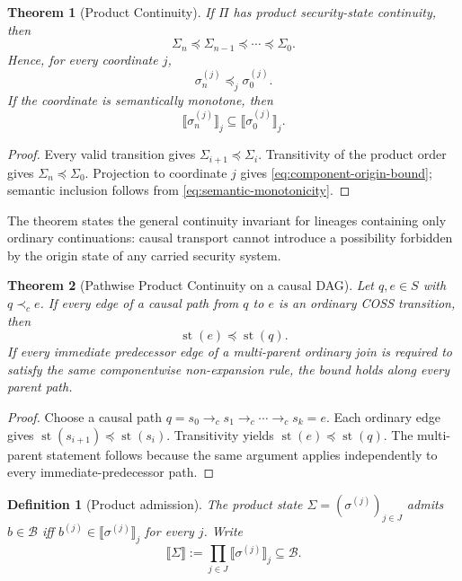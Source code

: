 \documentclass[10pt,twocolumn]{article}
\newcommand{\Model}{\textnormal{\textsc{COSS}}\xspace}
\newcommand{\sem}[1]{\llbracket #1 \rrbracket}
\newcommand{\state}{\Sigma}
\newcommand{\coord}{\sigma}
\newcommand{\st}{\operatorname{st}}
\newcommand{\hb}{\prec_{c}}
\newtheorem{definition}{Definition}
\newtheorem{theorem}{Theorem}
\begin{document}
\begin{theorem}[Product Continuity]
If $\Pi$ has product security-state continuity, then
\begin{equation}
  \state_n\preceq\state_{n-1}\preceq\cdots\preceq\state_0.
\end{equation}
Hence, for every coordinate $j$,
\begin{equation}
  \coord_n^{(j)}\preceq_j\coord_0^{(j)}.
  \label{eq:component-origin-bound}
\end{equation}
If the coordinate is semantically monotone, then
\begin{equation}
  \sem{\coord_n^{(j)}}_j
  \subseteq
  \sem{\coord_0^{(j)}}_j.
\end{equation}
\end{theorem}

\begin{proof}
Every valid transition gives
$\state_{i+1}\preceq\state_i$.  Transitivity of the product order gives
$\state_n\preceq\state_0$.  Projection to coordinate $j$ gives
\eqref{eq:component-origin-bound}; semantic inclusion follows from
\eqref{eq:semantic-monotonicity}.
\end{proof}

The theorem states the general continuity invariant for lineages containing
only ordinary continuations: causal transport cannot introduce a possibility
forbidden by the origin state of any carried security system.


\begin{theorem}[Pathwise Product Continuity on a causal DAG]
\label{thm:dag-continuity}
Let $q,e\in S$ with $q\hb e$. If every edge of a causal path from $q$ to $e$
is an ordinary \Model transition, then
\begin{equation}
  \st(e)\preceq \st(q).
\end{equation}
If every immediate predecessor edge of a multi-parent ordinary join is required
to satisfy the same componentwise non-expansion rule, the bound holds along
every parent path.
\end{theorem}

\begin{proof}
Choose a causal path
$q=s_0\to_c s_1\to_c\cdots\to_c s_k=e$. Each ordinary edge gives
$\st(s_{i+1})\preceq\st(s_i)$. Transitivity yields
$\st(e)\preceq\st(q)$. The multi-parent statement follows because the same
argument applies independently to every immediate-predecessor path.
\end{proof}

\begin{definition}[Product admission]\label{def:product-admission}
The product state $\state=(\coord^{(j)})_{j\in J}$ admits
$b\in\mathcal{B}$ iff $b^{(j)}\in\sem{\coord^{(j)}}_j$ for every $j$.
Write
\begin{equation}
  \sem{\state}:=\prod_{j\in J}\sem{\coord^{(j)}}_j\subseteq\mathcal{B}.
\end{equation}
\end{definition}
\end{document}

